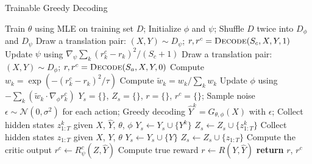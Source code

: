 \begin{algorithm}[htpb]
\caption{Trainable Greedy Decoding}
\label{cp7.alg.algo2}
\begin{algorithmic}[1]
\small
{}
\State Train $\theta$ using MLE on training set $D$;
\State Initialize $\phi$ and $\psi$;
\State Shuffle $D$ twice into $D_{\phi}$ and $D_{\psi}$
\State Draw a translation pair: $(X, Y)\sim D_{\psi}$;
\State $r, r^c=\textsc{Decode}(S_c, X, Y, 1)$
\State Update $\psi$ using $\nabla_{\psi}\sum_k{\left(r_k^c - r_k\right)^2}/(S_c+1)$
\EndFor
{}
\State Draw a translation pair: $(X, Y)\sim D_{\phi}$;
\State $r, r^c=\textsc{Decode}(S_a, X, Y, 0)$
\State Compute $w_k = \exp\left(-\left(r_k^c - r_k\right)^2/\tau\right)$
\State Compute $\tilde{w}_k=w_k/\sum_k{w_k}$
\State Update $\phi$ using $-\sum_k{\left(\tilde{w}_k\cdot \nabla_{\phi}r^c_k\right)}$
\EndFor
\EndWhile
\Statex{}
\setcounter{ALG@line}{0}
  \State $Y_s = \{\}$, $Z_s = \{\}$, $r = \{\}$, $r^c=\{\}$;
   \State Sample noise $\epsilon \sim \mathcal{N}(0, \sigma^2)$ for each action;
   \State Greedy decoding $\hat{Y}^{k} = G_{\theta, \phi}(X)$ with $\epsilon$;
   \State Collect hidden states $z^{k}_{1:T}$ given $X$, $\hat{Y}$, $\theta$, $\phi$
   \State $Y_s \leftarrow Y_s \cup \{Y^k\}$
   \State $Z_s \leftarrow Z_s \cup \{z^{k}_{1:T}\}$
  \EndFor
   \State Collect hidden states $z_{1:T}$ given $X$, $Y$, $\theta$
   \State $Y_s \leftarrow Y_s \cup \{Y\}$
   \State $Z_s \leftarrow Z_s \cup \{ z_{1:T} \}$
  \EndIf
   \State Compute the critic output $r^c \leftarrow R^c_{\psi}(Z, \hat{Y})$ 
   \State Compute true reward $r \leftarrow R(Y, \hat{Y})$
  \EndFor
  \State \textbf{return} $r$, $r^c$
\end{algorithmic}
\end{algorithm}




